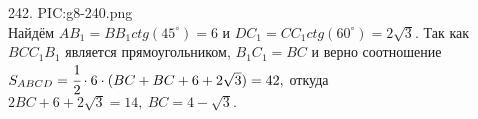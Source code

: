 242. {{PIC:g8-240.png}}\\
Найдём $AB_1=BB_1 ctg(45^\circ)=6$ и $DC_1=CC_1 ctg(60^\circ)=2\sqrt{3}.$ Так как $BCC_1B_1$ является прямоугольником, $B_1C_1=BC$ и верно соотношение
$S_{ABCD}=\cfrac{1}{2}\cdot6\cdot(BC+BC+6+2\sqrt{3})=42,$ откуда $2BC+6+2\sqrt{3}=14,\ BC=4-\sqrt{3}.$\\
